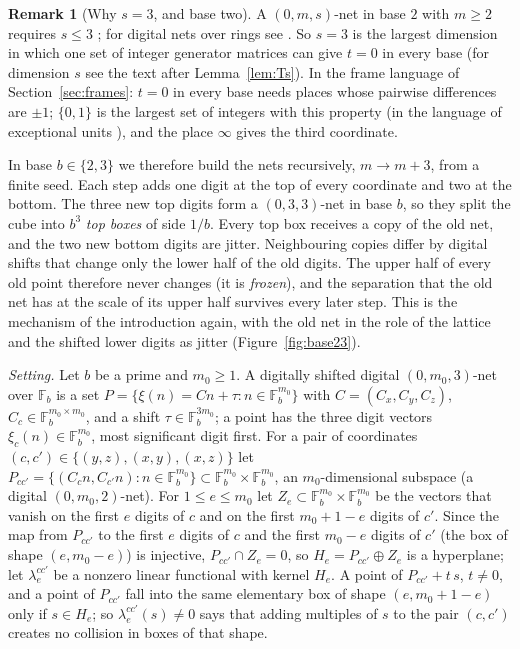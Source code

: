 \documentclass[11pt]{amsart}
\theoremstyle{definition}
\newtheorem{remark}[theorem]{Remark}
\theoremstyle{plain}
\newcommand{\F}{\mathbb{F}}
\begin{document}
\begin{remark}[Why $s=3$, and base two]\label{rem:base2}
A $(0,m,s)$-net in base $2$ with $m\ge2$ requires $s\le3$ \cite[Cor.~5.11]{Nie87}; for digital nets over rings see \cite[Thm.~2]{LNS96}. So $s=3$ is the largest dimension in which one set of integer generator matrices can give $t=0$ in every base (for dimension $s$ see the text after Lemma~\ref{lem:Ts}). In the frame language of Section~\ref{sec:frames}: $t=0$ in every base needs places whose pairwise differences are $\pm1$; $\{0,1\}$ is the largest set of integers with this property (in the language of exceptional units \cite{Len77}), and the place $\infty$ gives the third coordinate.
\end{remark}

In base $b\in\{2,3\}$ we therefore build the nets recursively, $m\to m+3$, from a finite seed. Each step adds one digit at the top of every coordinate and two at the bottom. The three new top digits form a $(0,3,3)$-net in base $b$, so they split the cube into $b^3$ \emph{top boxes} of side $1/b$. Every top box receives a copy of the old net, and the two new bottom digits are jitter. Neighbouring copies differ by digital shifts that change only the lower half of the old digits. The upper half of every old point therefore never changes (it is \emph{frozen}), and the separation that the old net has at the scale of its upper half survives every later step. This is the mechanism of the introduction again, with the old net in the role of the lattice and the shifted lower digits as jitter (Figure~\ref{fig:base23}).

\emph{Setting.} Let $b$ be a prime and $m_0\ge1$. A digitally shifted digital $(0,m_0,3)$-net over $\F_b$ is a set $P=\{\xi(n)=Cn+\tau:n\in\F_b^{m_0}\}$ with $C=(C_x,C_y,C_z)$, $C_c\in\F_b^{m_0\times m_0}$, and a shift $\tau\in\F_b^{3m_0}$; a point has the three digit vectors $\xi_c(n)\in\F_b^{m_0}$, most significant digit first. For a pair of coordinates $(c,c')\in\{(y,z),(x,y),(x,z)\}$ let $P_{cc'}=\{(C_cn,C_{c'}n):n\in\F_b^{m_0}\}\subset\F_b^{m_0}\times\F_b^{m_0}$, an $m_0$-dimensional subspace (a digital $(0,m_0,2)$-net). For $1\le e\le m_0$ let $Z_e\subset\F_b^{m_0}\times\F_b^{m_0}$ be the vectors that vanish on the first $e$ digits of $c$ and on the first $m_0+1-e$ digits of $c'$. Since the map from $P_{cc'}$ to the first $e$ digits of $c$ and the first $m_0-e$ digits of $c'$ (the box of shape $(e,m_0-e)$) is injective, $P_{cc'}\cap Z_e=0$, so $H_e=P_{cc'}\oplus Z_e$ is a hyperplane; let $\lambda^{cc'}_e$ be a nonzero linear functional with kernel $H_e$. A point of $P_{cc'}+t\,s$, $t\ne0$, and a point of $P_{cc'}$ fall into the same elementary box of shape $(e,m_0+1-e)$ only if $s\in H_e$; so $\lambda^{cc'}_e(s)\ne0$ says that adding multiples of $s$ to the pair $(c,c')$ creates no collision in boxes of that shape.
\end{document}

